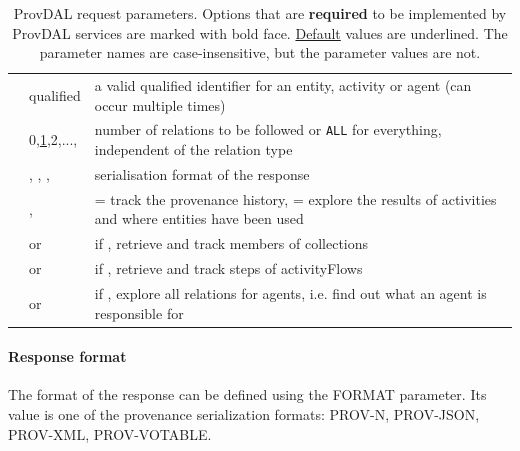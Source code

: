 \begin{table}[h]
\small
\begin{tabulary}{1.0\textwidth}{@{}p{0.17\textwidth}p{0.22\textwidth}p{0.53\textwidth}@{}}
\toprule
{} &  & \\\hline
\midrule
\textbf{} & qualified  & a valid qualified identifier for an entity, activity or agent (can occur multiple times)\\
\textbf{} & 0,\underline{1},2,...,  &  number of relations to be followed or \texttt{ALL} for everything, independent of the relation type\\
\textbf{} & , \newline{}, \newline{}, \newline{} & serialisation format of the response\\\hline
{} & ,  &  = track the provenance history, \newline{} = explore the results of activities and where entities have been used\\
 &  or  & if , retrieve and track members of collections\\
 &  or  & if , retrieve and track steps of activityFlows\\
 &  or  & if , explore all relations for agents, i.e. find out what an agent is responsible for\\
\bottomrule
\end{tabulary}
\caption{ProvDAL request parameters. Options that are \textbf{required} to be implemented by ProvDAL services are marked with bold face. \underline{Default} values are underlined. The parameter names are case-insensitive, but the parameter values are not.}
\label{tab:provdal-parameters}
\end{table}


\paragraph{Response format}
The format of the response can be defined using the FORMAT parameter. Its value is one of the provenance serialization formats: PROV-N, PROV-JSON, PROV-XML, PROV-VOTABLE.

